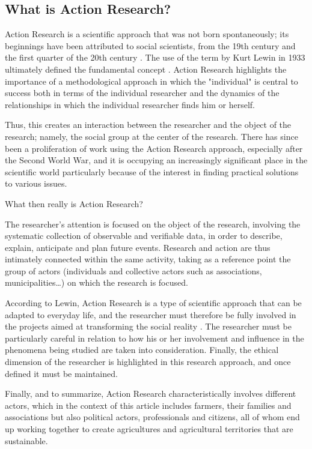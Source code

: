 \documentclass[10pt,a4paper]{article}
\begin{document}
\begin{multicols}{2}
\section{What is Action Research?}
\noindent Action Research is a scientific approach that was not born spontaneously; its beginnings have been attributed to social scientists, from the 19th century and the first quarter of the 20th century \citep{r03}. The use of the term by Kurt Lewin in 1933 ultimately defined the fundamental concept \citep{r04}. Action Research highlights the importance of a methodological approach in which the "individual" is central to success both in terms of the individual researcher and the dynamics of the relationships in which the individual researcher finds him or herself.

Thus, this creates an interaction between the researcher and the object of the research; namely, the social group at the center of the research. There has since been a proliferation of work using the Action Research approach, especially after the Second World War, and it is occupying an increasingly significant place in the scientific world particularly because of the interest in finding practical solutions to various issues.

What then really is Action Research?

The researcher's attention is focused on the object of the research, involving the systematic collection of observable and verifiable data, in order to describe, explain, anticipate and plan future events. Research and action are thus intimately connected within the same activity, taking as a reference point the group of actors (individuals and collective actors such as associations, municipalities\ldots)  on which the research is focused.

According to Lewin, Action Research is a type of scientific approach that can be adapted to everyday life, and the researcher must therefore be fully involved in the projects aimed at transforming the social reality \citep{r05}. The researcher must be particularly careful in relation to how his or her involvement and influence in the phenomena being studied are taken into consideration. Finally, the ethical dimension of the researcher is highlighted in this research approach, and once defined it must be maintained.

Finally, and to summarize, Action Research characteristically involves different actors, which in the context of this article includes farmers, their families and associations but also political actors, professionals and citizens, all of whom end up working together to create agricultures and agricultural territories that are sustainable.


\end{multicols}
\end{document}
